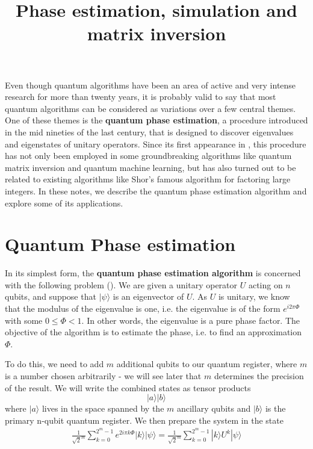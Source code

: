 \documentclass[a4paper, draft]{article}
\title{Phase estimation, simulation and matrix inversion}
\theoremstyle{own}
\theoremstyle{remark}
\begin{document}
\maketitle


Even though quantum algorithms have been an area of active and very intense research for more than twenty years, it is probably valid to say that most quantum algorithms can be considered as variations over a few central themes. One of these themes is the {\bf quantum phase estimation}, a procedure introduced in the mid nineties of the last century, that is designed to discover eigenvalues and eigenstates of unitary operators. Since its first appearance in \cite{Kitaev}, this procedure has not only been employed in some groundbreaking algorithms like quantum matrix inversion and quantum machine learning, but has also turned out to be related to existing algorithms like Shor's famous algorithm for factoring large integers. In these notes, we describe the quantum phase estimation algorithm and explore some of its applications.


\section{Quantum Phase estimation}\label{sec:qpe}

In its simplest form, the {\bf quantum phase estimation algorithm} is concerned with the following problem (\cite{CleveEkert}). We are given a unitary operator $U$ acting on $n$ qubits, and suppose that $|\psi \rangle$ is an eigenvector of $U$. As $U$ is unitary, we know that the modulus of the eigenvalue is one, i.e. the eigenvalue is of the form $e^{i2\pi \Phi}$ with some $0 \leq \Phi < 1$. In other words, the eigenvalue is a pure phase factor. The objective of the algorithm is to estimate the phase, i.e. to find an approximation $\Phi$. 

To do this, we need to add $m$ additional qubits to our quantum register, where $m$ is a number chosen arbitrarily - we will see later that $m$ determines the precision of the result. We will write the combined states as tensor products
$$
|a \rangle |b \rangle
$$
where $|a \rangle$ lives in the space spanned by the $m$ ancillary qubits and $|b \rangle$ is the primary n-qubit quantum register. We then prepare the system in the state 
\begin{align}\label{eq:qpesuperposition}
\frac{1}{\sqrt{2}^m} \sum_{k = 0}^{2^m - 1} e^{2i\pi k \Phi} |k \rangle |\psi \rangle = \frac{1}{\sqrt{2}^m} \sum_{k = 0}^{2^m - 1}  |k \rangle U^k |\psi \rangle
\end{align}
\end{document}
